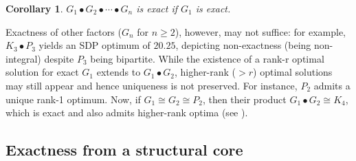 \documentclass[a4paper,fleqn]{cas-sc}
\newcommand{\1}{\mathbf{1}}
\DeclareMathOperator{\mc}{MAXCUT}
\newenvironment{proofsketch}{%
  \par\noindent\textit{Proof sketch.}\ }%
  {\hfill\par}
\newtheorem{corollary}[theorem]{Corollary}
\newcommand{\ignore}[1]{}
\begin{document}
\ignore{
\begin{proofsketch}
 We extend the optimal cut of $G_1$ by assigning all copies of a vertex of $G_1$ the same label ($+1$ or $-1$) in $G_1 \!\bullet\! G_2$, which yields a cut of value $(|V_2|^2 \cdot \mc(G_1))$. On the dual side, the construction lifts naturally and decomposes into parts that remain feasible, so strong duality certifies optimality. Rank is preserved by taking the Kronecker product of an optimal solution of $G_1$ with the all-ones matrix. 
\end{proofsketch}
}

\begin{corollary}{\label{lex_cor}}
 $G_1 \bullet G_2 \bullet \cdots \bullet G_n$ is exact if $G_1$ is exact.   
\end{corollary}

\begin{remark}
Exactness of other factors ($G_n$ for $n \geq 2$), however, may not suffice: for example, $K_3 \bullet P_3$ yields an SDP optimum of $20.25$, depicting non-exactness (being non-integral) despite $P_3$ being bipartite. While the existence of a rank-r optimal solution for exact $G_1$ extends to $G_1 \bullet G_2$, higher-rank ($> r$) optimal solutions may still appear and hence uniqueness is not preserved. For instance, $P_2$ admits a unique rank-1 optimum. Now, if $G_1 \cong G_2 \cong P_2$, then their product $G_1 \bullet G_2 \cong K_4$, which is exact and also admits higher-rank optima (see ).
\end{remark}




\subsection{Exactness from a structural core} 
\end{document}
